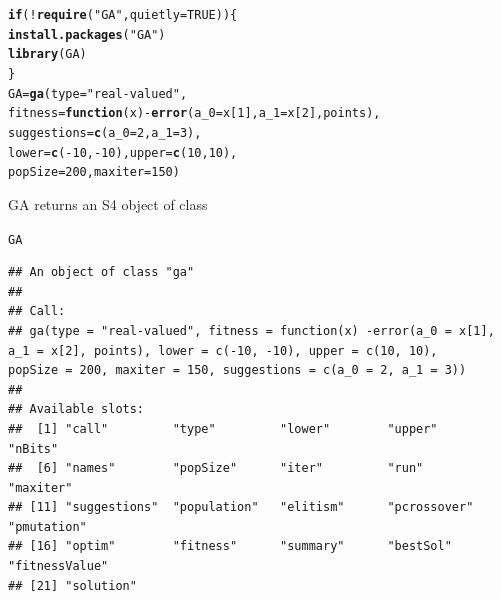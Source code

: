 \documentclass[aspectratio=169]{beamer}\usepackage[]{graphicx}\usepackage[]{xcolor}
\makeatletter
\newcommand{\hlnum}[1]{\textcolor[rgb]{0.686,0.059,0.569}{#1}}%
\newcommand{\hlsng}[1]{\textcolor[rgb]{0.192,0.494,0.8}{#1}}%
\newcommand{\hlopt}[1]{\textcolor[rgb]{0,0,0}{#1}}%
\newcommand{\hldef}[1]{\textcolor[rgb]{0.345,0.345,0.345}{#1}}%
\newcommand{\hlkwa}[1]{\textcolor[rgb]{0.161,0.373,0.58}{\textbf{#1}}}%
\newcommand{\hlkwb}[1]{\textcolor[rgb]{0.69,0.353,0.396}{#1}}%
\newcommand{\hlkwc}[1]{\textcolor[rgb]{0.333,0.667,0.333}{#1}}%
\newcommand{\hlkwd}[1]{\textcolor[rgb]{0.737,0.353,0.396}{\textbf{#1}}}%
\newenvironment{kframe}{%
 \def\at@end@of@kframe{}%
 \ifinner\ifhmode%
  \def\at@end@of@kframe{\end{minipage}}%
  \begin{minipage}{\columnwidth}%
 \fi\fi%
 \def\FrameCommand##1{\hskip\@totalleftmargin \hskip-\fboxsep
 \colorbox{shadecolor}{##1}\hskip-\fboxsep
     \hskip-\linewidth \hskip-\@totalleftmargin \hskip\columnwidth}%
 \MakeFramed {\advance\hsize-\width
   \@totalleftmargin\z@ \linewidth\hsize
   \@setminipage}}%
 {\par\unskip\endMakeFramed%
 \at@end@of@kframe}
\newenvironment{knitrout}{}{} %
\makeatother
\begin{document}
\begin{frame}[fragile]
\begin{knitrout}
\color{fgcolor}\begin{kframe}
\begin{alltt}
\hlkwa{if} \hldef{(}\hlopt{!}\hlkwd{require}\hldef{(}\hlsng{"GA"}\hldef{,} \hlkwc{quietly} \hldef{=} \hlnum{TRUE}\hldef{)) \{}
  \hlkwd{install.packages}\hldef{(}\hlsng{"GA"}\hldef{)}
  \hlkwd{library}\hldef{(GA)}
\hldef{\}}
\hldef{GA} \hlkwb{=} \hlkwd{ga}\hldef{(}\hlkwc{type} \hldef{=} \hlsng{"real-valued"}\hldef{,}
        \hlkwc{fitness} \hldef{=} \hlkwa{function}\hldef{(}\hlkwc{x}\hldef{)} \hlopt{-}\hlkwd{error}\hldef{(}\hlkwc{a_0} \hldef{= x[}\hlnum{1}\hldef{],} \hlkwc{a_1} \hldef{= x[}\hlnum{2}\hldef{], points),}
        \hlkwc{suggestions} \hldef{=} \hlkwd{c}\hldef{(}\hlkwc{a_0} \hldef{=} \hlnum{2}\hldef{,} \hlkwc{a_1} \hldef{=} \hlnum{3}\hldef{),}
        \hlkwc{lower} \hldef{=} \hlkwd{c}\hldef{(}\hlopt{-}\hlnum{10}\hldef{,} \hlopt{-}\hlnum{10}\hldef{),} \hlkwc{upper} \hldef{=} \hlkwd{c}\hldef{(}\hlnum{10}\hldef{,} \hlnum{10}\hldef{),}
        \hlkwc{popSize} \hldef{=} \hlnum{200}\hldef{,} \hlkwc{maxiter} \hldef{=} \hlnum{150}\hldef{)}
\end{alltt}
\end{kframe}
\end{knitrout}
\end{frame}

\begin{frame}[fragile]
GA returns an S4 object of class 
\vfill
\begin{knitrout}
\color{fgcolor}\begin{kframe}
\begin{alltt}
\hldef{GA}
\end{alltt}
\begin{verbatim}
## An object of class "ga"
## 
## Call:
## ga(type = "real-valued", fitness = function(x) -error(a_0 = x[1],     a_1 = x[2], points), lower = c(-10, -10), upper = c(10, 10),     popSize = 200, maxiter = 150, suggestions = c(a_0 = 2, a_1 = 3))
## 
## Available slots:
##  [1] "call"         "type"         "lower"        "upper"        "nBits"       
##  [6] "names"        "popSize"      "iter"         "run"          "maxiter"     
## [11] "suggestions"  "population"   "elitism"      "pcrossover"   "pmutation"   
## [16] "optim"        "fitness"      "summary"      "bestSol"      "fitnessValue"
## [21] "solution"
\end{verbatim}
\end{kframe}
\end{knitrout}
\end{frame}
\end{document}
